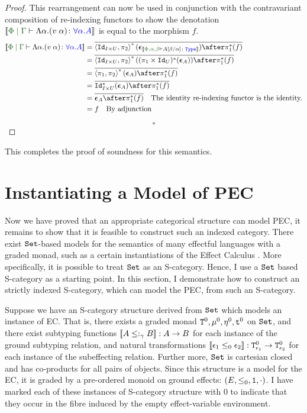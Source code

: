 \documentclass{Report}
\begin{document}
\begin{proof}
    This rearrangement can now be used in conjunction with the contravariant composition of re-indexing functors to show the denotation $\deno{\gpetyperelation{\elam{\a}{(\eapp{v}{\a})}}{\all{\a}{A}}}$ is equal to the morphism $f$.
    \begin{align*}
        \deno{\gpetyperelation{\elam{\a}{(\eapp{v}{\a})}}{\all{\a}{A}}} & = \bar{\pr{\Id{I\times U}}{\pp}\star(\counit{\deno{\typerelation{\P,\a,\b}{A\ssub{\a}{\b}}{\type}}})\after\pstar(f)}\\
        & = \bar{\pr{\Id{I\times U}}{\pp}\star((\p\times\Id{U})\star(\counit{A}))\after\pstar(f)}\\
        & = \bar{\pr{\p}{\pp}\star(\counit{A})\after\pstar(f)}\\
        &= \bar{\Id{I\times U}\star(\counit{A})\after\pstar(f)} \\
        & = \bar{\counit{A}\after \pstar(f)}\qt{The identity re-indexing functor is the identity.}\\
        & = f \qt{By adjunction}
    \end{align*}


    $$\square$$

\end{proof}


This completes the proof of soundness for this semantics.

\chapter{Instantiating a Model of PEC}

Now we have proved that an appropriate categorical structure can model PEC, it remains to show that it is feasible to construct such an indexed category. There exist $\texttt{Set}$-based models for the semantics of many effectful languages with a graded monad, such as a certain instantiations of the Effect Calculus \cite{Katsumata:2014}. More specifically, it is possible to treat $\texttt{Set}$ as an S-category. Hence, I use a $\texttt{Set}$ based S-category as a starting point. In this section, I  demonstrate how to construct an strictly indexed S-category, which can model the PEC, from such an S-category.

Suppose we have an S-category structure derived from $\texttt{Set}$ which models an instance of EC. That is, there exists a graded monad $\texttt{T}^0_{}, \mu^0, \eta_{}^0, \texttt{t}^0$ on $\texttt{Set}$, and there exist subtyping functions ${\bf [\![}A\leq:_\gamma B{\bf ]\!]}: A \rightarrow B$ for each instance of the ground subtyping relation, and natural transformations ${\bf [\![}\epsilon_1 \leq_0 \epsilon_2{\bf ]\!]}: \texttt{T}^0_{\epsilon_1} \rightarrow \texttt{T}^0_{\epsilon_2}$ for each instance of the subeffecting relation. Further more, $\texttt{Set}$ is cartesian closed and has co-products for all pairs of objects. Since this structure is a model for the EC, it is graded by a pre-ordered monoid on ground effects: $(E, \leq_0, \texttt{1}, \cdot)$. I have marked each of these instances of S-category structure with $0$ to indicate that they occur in the fibre induced by the empty effect-variable environment.
\end{document}
